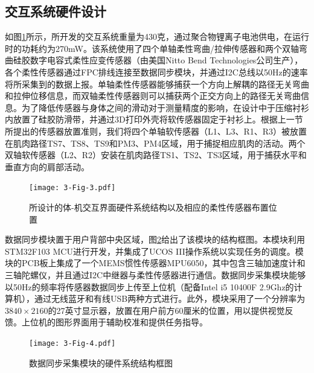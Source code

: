 \subsection{交互系统硬件设计}如图\ref{fig:3-3}所示，所开发的交互系统重量为430克，通过聚合物锂离子电池供电，在运行时的功耗约为270mW。该系统使用了四个单轴柔性弯曲/拉伸传感器和两个双轴弯曲硅胶数字电容式柔性应变传感器（由美国Nitto Bend Technologies公司生产），各个柔性传感器通过FPC排线连接至数据同步模块，并通过I2C总线以50Hz的速率将所采集到的数据上报。单轴柔性传感器能够捕获一个方向上解耦的路径无关弯曲和拉伸位移信息，而双轴柔性传感器则可以捕获两个正交方向上的路径无关弯曲信息。为了降低传感器与身体之间的滑动对于测量精度的影响，在设计中于压缩衬衫内放置了硅胶防滑带，并通过3D打印外壳将软传感器固定于衬衫上。根据上一节所提出的传感器放置准则，我们将四个单轴软传感器（L1、L3、R1、R3）被放置在肌肉路径TS7、TS8、TS9和PM3、PM4区域，用于捕捉相应肌肉的活动。两个双轴软传感器（L2、R2）安装在肌肉路径TS1、TS2、TS3区域，用于捕获水平和垂直方向的肩部活动。

\begin{figure}[htb]
    \centering
    \texttt{[image: 3-Fig-3.pdf]}
    \caption{所设计的体-机交互界面硬件系统结构以及相应的柔性传感器布置位置}
    \label{fig:3-3}
\end{figure}     

数据同步模块置于用户背部中央区域，图\ref{fig:3-4}给出了该模块的结构框图。本模块利用STM32F103 MCU进行开发，并集成了UCOS III操作系统以实现任务的调度。模块的PCB板上集成了一个MEMS惯性传感器MPU6050，其中包含三轴加速度计和三轴陀螺仪，并且通过I2C中继器与柔性传感器进行通信。数据同步采集模块能够以50Hz的频率将传感器数据同步上传至上位机（配备Intel i5 10400F 2.9Ghz的计算机），通过无线蓝牙和有线USB两种方式进行。此外，模块采用了一个分辨率为$3840\times2160$的27英寸显示器，放置在用户前方60厘米的位置，用以提供视觉反馈。上位机的图形界面用于辅助校准和提供任务指导。

\begin{figure}[htb]
    \centering
    \texttt{[image: 3-Fig-4.pdf]}
    \caption{数据同步采集模块的硬件系统结构框图}
    \label{fig:3-4}
\end{figure} 
